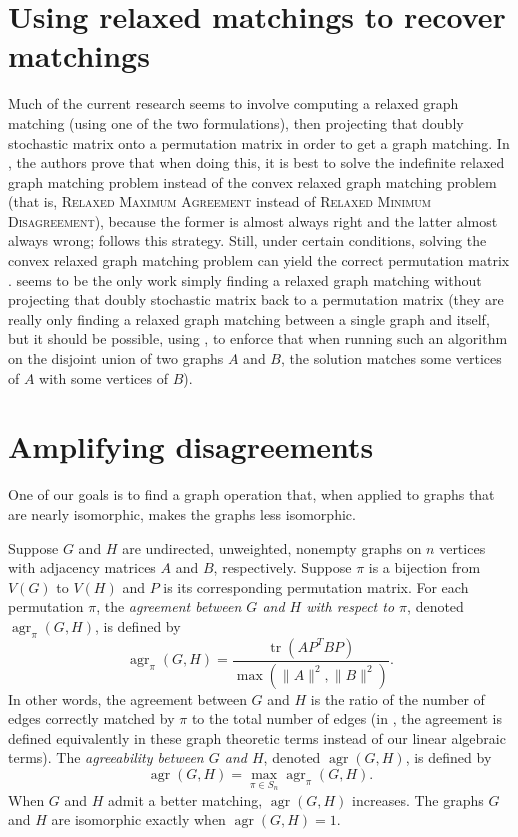 \documentclass{article}
\newcommand{\1}{\mathbf{1}}
\newcommand{\RMD}{\textsc{Relaxed Minimum Disagreement}}
\newcommand{\RMA}{\textsc{Relaxed Maximum Agreement}}
\DeclareMathOperator{\tr}{tr}
\DeclareMathOperator{\agr}{agr}
\begin{document}
\section{Using relaxed matchings to recover matchings}

Much of the current research seems to involve computing a relaxed graph matching (using one of the two formulations), then projecting that doubly stochastic matrix onto a permutation matrix in order to get a graph matching.
In \autocite{l14}, the authors prove that when doing this, it is best to solve the indefinite relaxed graph matching problem instead of the convex relaxed graph matching problem (that is, \RMA{} instead of \RMD{}), because the former is almost always right and the latter almost always wrong; \autocite{v14} follows this strategy.
Still, under certain conditions, solving the convex relaxed graph matching problem can yield the correct permutation matrix \autocite{abk14, fs14}.
\autocite{kmgg14} seems to be the only work simply finding a relaxed graph matching without projecting that doubly stochastic matrix back to a permutation matrix (they are really only finding a relaxed graph matching between a single graph and itself, but it should be possible, using \autocite{gkms14}, to enforce that when running such an algorithm on the disjoint union of two graphs $A$ and $B$, the solution matches some vertices of $A$ with some vertices of $B$).

\section{Amplifying disagreements}

One of our goals is to find a graph operation that, when applied to graphs that are nearly isomorphic, makes the graphs less isomorphic.

Suppose $G$ and $H$ are undirected, unweighted, nonempty graphs on $n$ vertices with adjacency matrices $A$ and $B$, respectively.
Suppose $\pi$ is a bijection from $V(G)$ to $V(H)$ and $P$ is its corresponding permutation matrix.
For each permutation $\pi$, the \emph{agreement between $G$ and $H$ with respect to $\pi$}, denoted $\agr_\pi(G, H)$, is defined by
\begin{equation*}
  \agr_\pi(G, H) = \frac{\tr(AP^TBP)}{\max(\|A\|^2, \|B\|^2)}.
\end{equation*}
In other words, the agreement between $G$ and $H$ is the ratio of the number of edges correctly matched by $\pi$ to the total number of edges (in \autocite{owwz14}, the agreement is defined equivalently in these graph theoretic terms instead of our linear algebraic terms).
The \emph{agreeability between $G$ and $H$}, denoted $\agr(G, H)$, is defined by
\begin{equation*}
  \agr(G, H) = \max_{\pi \in S_n} \agr_\pi(G, H).
\end{equation*}
When $G$ and $H$ admit a better matching, $\agr(G, H)$ increases.
The graphs $G$ and $H$ are isomorphic exactly when $\agr(G, H) = 1$.
\end{document}
